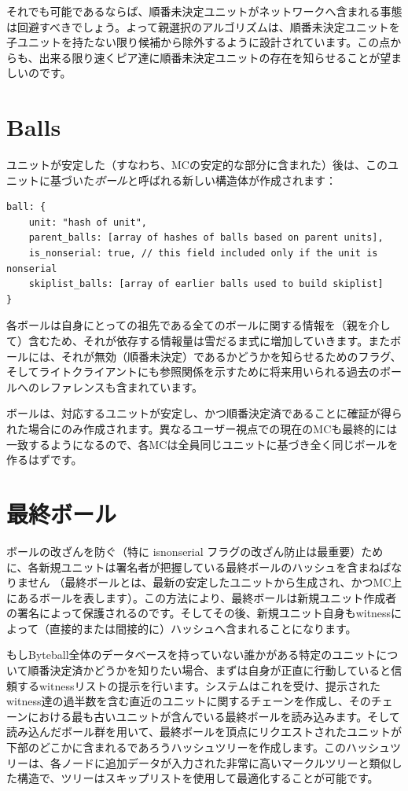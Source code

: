 \documentclass[a4paper, dvipdfmx]{jsarticle}
\begin{document}
それでも可能であるならば、順番未決定ユニットがネットワークへ含まれる事態は回避すべきでしょう。よって親選択のアルゴリズムは、順番未決定ユニットを子ユニットを持たない限り候補から除外するように設計されています。この点からも、出来る限り速くピア達に順番未決定ユニットの存在を知らせることが望ましいのです。

\section{Balls}
ユニットが安定した（すなわち、MCの安定的な部分に含まれた）後は、このユニットに基づいた\textit{ボール}と呼ばれる新しい構造体が作成されます：

\begin{lstlisting}[basicstyle=\ttfamily\footnotesize, frame=none]
ball: {
    unit: "hash of unit",
    parent_balls: [array of hashes of balls based on parent units],
    is_nonserial: true, // this field included only if the unit is nonserial
    skiplist_balls: [array of earlier balls used to build skiplist]
}
\end{lstlisting}

\noindent 各ボールは自身にとっての祖先である全てのボールに関する情報を（親を介して）含むため、それが依存する情報量は雪だるま式に増加していきます。またボールには、それが無効（順番未決定）であるかどうかを知らせるためのフラグ、そしてライトクライアントにも参照関係を示すために将来用いられる過去のボールへのレファレンスも含まれています。

ボールは、対応するユニットが安定し、かつ順番決定済であることに確証が得られた場合にのみ作成されます。異なるユーザー視点での現在のMCも最終的には一致するようになるので、各MCは全員同じユニットに基づき全く同じボールを作るはずです。

\section{最終ボール}
ボールの改ざんを防ぐ（特に is\textunderscore nonserial フラグの改ざん防止は最重要）ために、各新規ユニットは署名者が把握している最終ボールのハッシュを含まねばなりません （最終ボールとは、最新の安定したユニットから生成され、かつMC上にあるボールを表します）。この方法により、最終ボールは新規ユニット作成者の署名によって保護されるのです。そしてその後、新規ユニット自身もwitnessによって（直接的または間接的に）ハッシュへ含まれることになります。

もしByteball全体のデータベースを持っていない誰かがある特定のユニットについて順番決定済かどうかを知りたい場合、まずは自身が正直に行動していると信頼するwitnessリストの提示を行います。システムはこれを受け、提示されたwitness達の過半数を含む直近のユニットに関するチェーンを作成し、そのチェーンにおける最も古いユニットが含んでいる最終ボールを読み込みます。そして読み込んだボール群を用いて、最終ボールを頂点にリクエストされたユニットが下部のどこかに含まれるであろうハッシュツリーを作成します。このハッシュツリーは、各ノードに追加データが入力された非常に高いマークルツリーと類似した構造で、ツリーはスキップリストを使用して最適化することが可能です。
\end{document}
